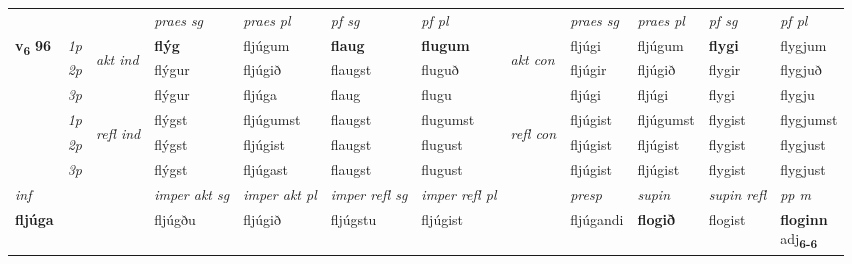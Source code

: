 \begin{longtable}[l]{X>{\footnotesize\itshape}llXXXXlXXXX}
 & &   & \textit{praes sg}  & \textit{praes pl}    & \textit{ pf sg} & \textit{pf pl} & & \textit{praes sg}  & \textit{praes pl}    & \textit{pf sg} & \textit{pf pl }  \\ \cmidrule{4-7} \cmidrule{9-12}
 \multirow{2}{*}{{{\textbf{v{\textsubscript{6}}} \Large{\textbf{96}}}}}  & 1p & \multirow{3}{*}{\begin{turn}{90}\textit{akt ind}\end{turn}} & \textbf{flýg} & fljúgum & \textbf{flaug} & \textbf{flugum} & \multirow{3}{*}{\begin{turn}{90}\textit{akt con}\end{turn}} &fljúgi & fljúgum & \textbf{flygi} & flygjum\\*
 & 2p &  &  flýgur  & fljúgið & flaugst & fluguð & & fljúgir & fljúgið & flygir & flygjuð \\*
 & 3p &  & flýgur & fljúga & flaug & flugu & & fljúgi & fljúgi& flygi & flygju \\*
\cmidrule{4-7} \cmidrule{9-12}
 & 1p & \multirow{3}{*}{\begin{turn}{90}\textit{refl ind}\end{turn}}  & flýgst & fljúgumst & flaugst & flugumst & \multirow{3}{*}{\begin{turn}{90}\textit{refl con}\end{turn}}  &fljúgist & fljúgumst & flygist & flygjumst \\*
 & 2p &  & flýgst & fljúgist & flaugst & flugust & &fljúgist & fljúgist & flygist & flygjust \\*
 & 3p  & & flýgst & fljúgast & flaugst & flugust & & fljúgist & fljúgist& flygist & flygjust \\*
\cmidrule{4-7} \cmidrule{9-12}

   {\textit{inf}} & &  & \textit{imper akt sg} & \textit{imper akt pl} & \textit{imper refl sg} & \textit{imper refl pl} && \textit{presp} & \textit{supin} & \textit{supin refl} & \textit{pp m} \\*
  {\textbf{fljúga}} & && fljúgðu  & fljúgið & fljúgstu & fljúgist && fljúgandi &  \textbf{flogið} & flogist & \specialcell{\textbf{floginn} \\ adj\textbf{\textsubscript{6-6}}} \\*

\midrule


\end{longtable}
